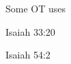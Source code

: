 \begin{compactdesc}
						
						
						
				\end{compactdesc}
				
				\begin{compactdesc}
					\item[Some OT uses] \phantom{.} %
						\begin{compactdesc}
							\item[Isaiah 33:20]
							\item[Isaiah 54:2] 
						\end{compactdesc}
				\end{compactdesc}
			
		
		
	
	
			

